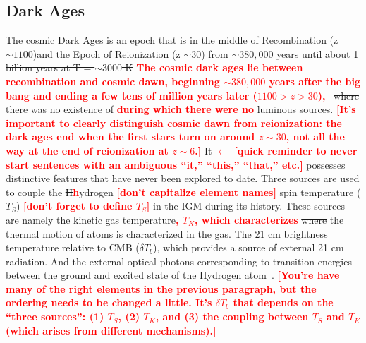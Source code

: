 \documentclass[12pt,a4paper]{report}
\newcommand{\attention}[1]{\textcolor{red}{\bf {#1}}}
\begin{document}
	\subsection{Dark Ages}
	
	\st{The cosmic Dark Ages is an epoch that is in the middle of Recombination (z $\sim1100$)and the Epoch of Reionization (z $\sim30$) from $\sim 380,000$ years until about 1 billion years at T = $\sim3000$ K} \attention{The cosmic dark ages lie between recombination and cosmic dawn, beginning $\sim380,000$ years after the big bang and ending a few tens of million years later ($1100 > z > 30$),}~\citep{2014arXiv1412.2096J} \st{where there was no existence of} \attention{during which there were no} luminous sources.  \attention{[It's important to clearly distinguish cosmic dawn from reionization: the dark ages end when the first stars turn on around $z \sim 30$, not all the way at the end of reionization at $z \sim 6$.]}
        It \attention{$\leftarrow$ [quick reminder to never start sentences with an ambiguous ``it,'' ``this,'' ``that,'' etc.]} possesses distinctive features that have never been explored to date. Three sources are used to couple the \st{H}\attention{h}ydrogen \attention{[don't capitalize element names]} spin temperature ($T_S$) \attention{[don't forget to define $T_S$]} in the IGM during its history. These sources are namely the kinetic gas temperature\attention{, $T_K$, which characterizes} \st{where} the thermal motion of atoms \st{is characterized} in the gas. The 21 cm brightness temperature relative to CMB ($\delta$$T_b$), which provides a source of external 21 cm radiation. And the external optical photons corresponding to transition energies between the ground and excited state of the Hydrogen atom~\citep{2015aska.confE...1K,2006PhR...433..181F}.  \attention{[You're have many of the right elements in the previous paragraph, but the ordering needs to be changed a little.  It's $\delta T_b$ that depends on the ``three sources'': (1) $T_S$, (2) $T_K$, and (3) the coupling between $T_S$ and $T_K$ (which arises from different mechanisms).]} \\
\end{document}
